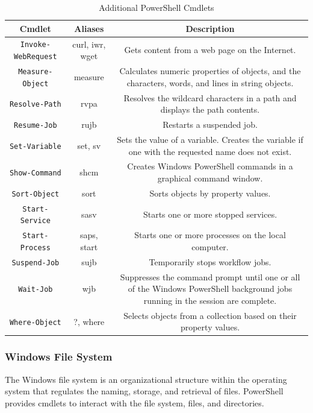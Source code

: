     \begin{table}[h!]
    \centering
    \begin{adjustbox}{width=1\textwidth}
    \begin{tabular}{|c|c|c|}
    \hline
    \textbf{Cmdlet} & \textbf{Aliases} & \textbf{Description} \\
    \hline
    \texttt{Invoke-WebRequest} & curl, iwr, wget & Gets content from a web page on the Internet. \\
    \texttt{Measure-Object} & measure & Calculates numeric properties of objects, and the characters, words, and lines in string objects. \\
    \texttt{Resolve-Path} & rvpa & Resolves the wildcard characters in a path and displays the path contents. \\
    \texttt{Resume-Job} & rujb & Restarts a suspended job. \\
    \texttt{Set-Variable} & set, sv & Sets the value of a variable. Creates the variable if one with the requested name does not exist. \\
    \texttt{Show-Command} & shcm & Creates Windows PowerShell commands in a graphical command window. \\
    \texttt{Sort-Object} & sort & Sorts objects by property values. \\
    \texttt{Start-Service} & sasv & Starts one or more stopped services. \\
    \texttt{Start-Process} & saps, start & Starts one or more processes on the local computer. \\
    \texttt{Suspend-Job} & sujb & Temporarily stops workflow jobs. \\
    \texttt{Wait-Job} & wjb & Suppresses the command prompt until one or all of the Windows PowerShell background jobs running in the session are complete. \\
    \texttt{Where-Object} & ?, where & Selects objects from a collection based on their property values. \\
    \hline
    \end{tabular}
    \end{adjustbox}
    \caption{Additional PowerShell Cmdlets}
    \label{table:cmdlets2}
    \end{table}

\subsubsection{Windows File System}
The Windows file system is an organizational structure within the operating system that regulates the naming, storage, and retrieval of files. PowerShell provides cmdlets to interact with the file system, files, and directories.

